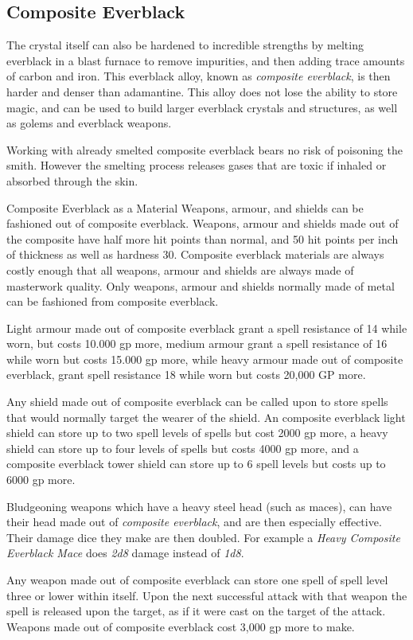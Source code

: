 \subsection{Composite Everblack}
\label{sec:Composite Everblack}

The crystal itself can also be hardened to incredible strengths by melting
everblack in a blast furnace to remove impurities, and then adding trace
amounts of carbon and iron. This everblack alloy, known as \emph{composite
everblack}, is then harder and denser than adamantine. This alloy does not lose
the ability to store magic, and can be used to build larger everblack crystals
and structures, as well as golems and everblack weapons.

Working with already smelted composite everblack bears no risk of poisoning the
smith. However the smelting process releases gases that are toxic if inhaled
or absorbed through the skin.

\begin{35e}{Composite Everblack as a Material}
  Weapons, armour, and shields can be fashioned out of composite everblack.
  Weapons, armour and shields made out of the composite have half more hit
  points than normal, and 50 hit points per inch of thickness as well as
  hardness 30. Composite everblack materials are always costly enough that all
  weapons, armour and shields are always made of masterwork quality.  Only
  weapons, armour and shields normally made of metal can be fashioned from
  composite everblack.

  Light armour made out of composite everblack grant a spell resistance of 14
  while worn, but costs 10.000 gp more, medium armour grant a spell resistance
  of 16 while worn but costs 15.000 gp more, while heavy armour made out of
  composite everblack, grant spell resistance 18 while worn but costs 20,000
  GP more.

  Any shield made out of composite everblack can be called upon to store
  spells that would normally target the wearer of the shield. An composite
  everblack light shield can store up to two spell levels of spells but cost
  2000 gp more, a heavy shield can store up to four levels of spells but costs
  4000 gp more, and a composite everblack tower shield can store up to 6 spell
  levels but costs up to 6000 gp more.

  Bludgeoning weapons which have a heavy steel head (such as maces), can have
  their head made out of \emph{composite everblack}, and are then especially
  effective. Their damage dice they make are then doubled. For example a
  \emph{Heavy Composite Everblack Mace} does \emph{2d8} damage instead of
  \emph{1d8}.

  Any weapon made out of composite everblack can store one spell of spell
  level three or lower within itself. Upon the next successful attack with
  that weapon the spell is released upon the target, as if it were cast on
  the target of the attack. Weapons made out of composite everblack cost
  3,000 gp more to make.
\end{35e}


